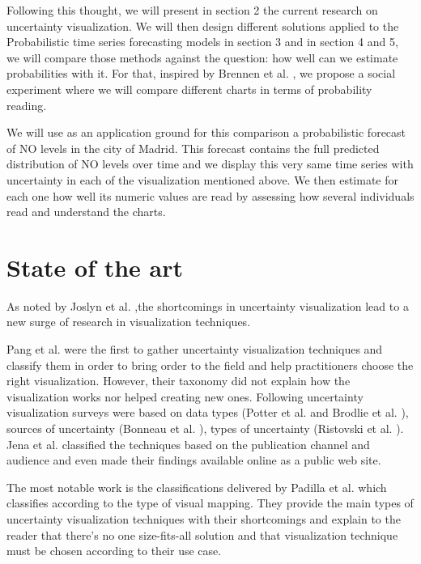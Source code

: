 \documentclass[a4paper,3p,sort&compress]{elsarticle}
\begin{document}
Following this thought, we will present in section 2 the current research on uncertainty visualization. We will then
design different solutions applied to the Probabilistic time series forecasting models in section 3 and in section 4 and 5,
we will compare those methods against the question: how well can we estimate probabilities with it. 
For that, inspired by Brennen et al. \cite{brennen_instrument_2018}, we propose a social experiment where we will compare different charts 
in terms of probability reading. 

We will use as an application ground for this comparison a probabilistic forecast of NO levels 
in the city of Madrid. This forecast contains the full predicted distribution of NO levels over time
and we display this very same time series with uncertainty in each of the visualization mentioned above. 
We then estimate for each one how well its numeric values are read by assessing how several individuals read 
and understand the charts.

\section{State of the art}
\label{sec:results}

As noted by Joslyn et al. \cite{joslyn_communicating_2010},the shortcomings in uncertainty visualization lead to a new surge of 
research in visualization techniques. 

Pang et al. \cite{pang_approaches_1997} were the first to gather uncertainty visualization techniques and classify them in 
order to bring order to the field and help 
practitioners choose the right visualization. However, their taxonomy did not explain how the visualization works nor helped creating new 
ones. Following uncertainty visualization surveys were based on data types (Potter et al. \cite{potter_quantification_2012} and Brodlie et al. 
\cite{brodlie_review_2012}), 
sources of uncertainty (Bonneau et al. \cite{bonneau_overview_2014}), types of uncertainty 
(Ristovski et al. \cite{ristovski_uncertainty_2014}). Jena et al. \cite{jena_uncertainty_2020} classified the techniques 
based on the publication channel and audience and even made their findings available online as a 
public web site. 

The most notable work is the classifications delivered by Padilla et al. \cite{padilla_uncertainty_2021} which classifies according to 
the type of visual mapping. They provide the main types of uncertainty visualization techniques with their shortcomings and 
explain to the reader that there's no one size-fits-all solution and that visualization technique must be chosen according to their use case.
\end{document}
